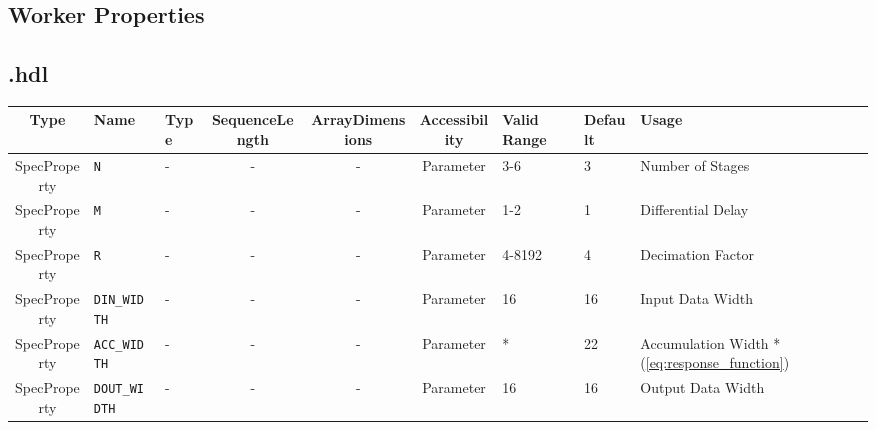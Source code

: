 \begin{landscape}
	\section*{Worker Properties}

	\subsection*{\comp.hdl}
	\begin{scriptsize}
		\begin{tabular}{|c|p{2cm}|p{1cm}|c|c|c|p{2cm}|p{1cm}|p{5cm}|}
			\hline
			\rowcolor{blue}
			Type         & Name              & Type & SequenceLength & ArrayDimensions & Accessibility & Valid Range & Default & Usage                                            \\
			\hline
			SpecProperty & \verb+N+          & -    & -              & -               & Parameter     & 3-6         & 3       & Number of Stages                                 \\
			\hline
			SpecProperty & \verb+M+          & -    & -              & -               & Parameter     & 1-2         & 1       & Differential Delay                               \\
			\hline
			SpecProperty & \verb+R+          & -    & -              & -               & Parameter     & 4-8192      & 4       & Decimation Factor                                \\
			\hline
			SpecProperty & \verb+DIN_WIDTH+  & -    & -              & -               & Parameter     & 16          & 16      & Input Data Width                                 \\
			\hline
			SpecProperty & \verb+ACC_WIDTH+  & -    & -              & -               & Parameter     & *           & 22      & Accumulation Width *(\ref{eq:response_function}) \\
			\hline
			SpecProperty & \verb+DOUT_WIDTH+ & -    & -              & -               & Parameter     & 16          & 16      & Output Data Width                                \\
			\hline
		\end{tabular}
	\end{scriptsize}

	


\end{landscape}
